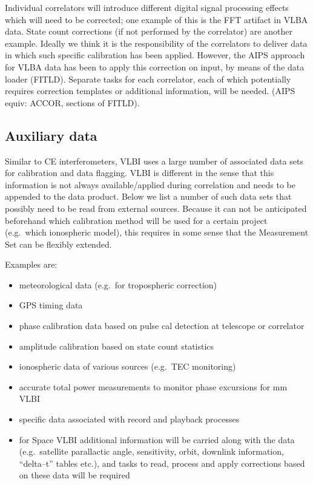 Individual correlators will introduce different digital signal
processing effects which will need to be corrected; one example of
this is the FFT artifact in VLBA data. State count corrections (if not
performed by the correlator) are another example.  Ideally we think it
is the responsibility of the correlators to deliver data in which such
specific calibration has been applied.  However, the AIPS approach for
VLBA data has been to apply this correction on input, by means of the
data loader (FITLD). Separate tasks for each correlator, each of which
potentially requires correction templates or additional information,
will be needed. (AIPS equiv: ACCOR, sections of FITLD).

\subsection{Auxiliary data}
\label{auxin}

Similar to CE interferometers, VLBI uses a large number of associated
data sets for calibration and data flagging. VLBI is different in the
sense that this information is not always available\slash applied during
correlation and needs to be appended to the data product. Below we
list a number of such data sets that possibly need to be read from
external sources. Because it can not be anticipated beforehand which
calibration method will be used for a certain project (e.g.\ which 
ionospheric model), this requires in some sense that the Measurement
Set can be flexibly extended.

\noindent Examples are:
\begin{itemize}
  
\item meteorological data (e.g.\ for tropospheric correction)

\item GPS timing data

\item phase calibration data based on pulse cal detection at telescope
  or correlator

\item amplitude calibration based on state count statistics

\item ionospheric data of various sources (e.g.\ TEC monitoring)
  
\item accurate total power measurements to monitor phase excursions
  for mm VLBI
  
\item specific data associated with record and playback processes
   
\item for Space VLBI additional information will be carried along with
  the data (e.g.\ satellite parallactic angle, sensitivity, orbit,
  downlink information, ``delta--t'' tables etc.), and tasks to read,
  process and apply corrections based on these data will be required

\end{itemize}

